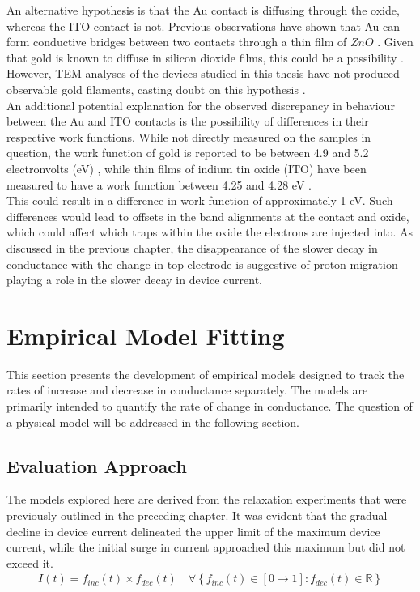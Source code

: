 \noindent An alternative hypothesis is that the Au contact is diffusing through the oxide, whereas the ITO contact is not. Previous observations have shown that Au can form conductive bridges between two contacts through a thin film of $ZnO$ \cite{peng2012resistive}. Given that gold is known to diffuse in silicon dioxide films, this could be a possibility \cite{madams1974migration}. However, TEM analyses of the devices studied in this thesis have not produced observable gold filaments, casting doubt on this hypothesis \cite{mehonic2017intrinsic}.\\


\noindent An additional potential explanation for the observed discrepancy in behaviour between the Au and ITO contacts is the possibility of differences in their respective work functions. While not directly measured on the samples in question, the work function of gold is reported to be between 4.9 and 5.2 electronvolts (eV) \cite{tran2019anisotropic}, while thin films of indium tin oxide (ITO) have been measured to have a work function between 4.25 and 4.28 eV \cite{schlaf2001work}. \\

\noindent This could result in a difference in work function of approximately 1 eV. Such differences would lead to offsets in the band alignments at the contact and oxide, which could affect which traps within the oxide the electrons are injected into. As discussed in the previous chapter, the disappearance of the slower decay in conductance with the change in top electrode is suggestive of proton migration playing a role in the slower decay in device current.

\section[Empirical Model Fitting]{Empirical Model Fitting}

This section presents the development of empirical models designed to track the rates of increase and decrease in conductance separately. The models are primarily intended to quantify the rate of change in conductance. The question of a physical model will be addressed in the following section.

\subsection[Evaluation Approach]{Evaluation Approach}

\noindent The models explored here are derived from the relaxation experiments that were previously outlined in the preceding chapter. It was evident that the gradual decline in device current delineated the upper limit of the maximum device current, while the initial surge in current approached this maximum but did not exceed it. 
\begin{align}
I(t) = f_{inc}(t) \times f_{dec}(t) \quad \forall \left\{ f_{inc}(t) \in [0 \to 1] : f_{dec}(t) \in \mathbb{R} \right\} \label{eq:5.1}
\end{align}


